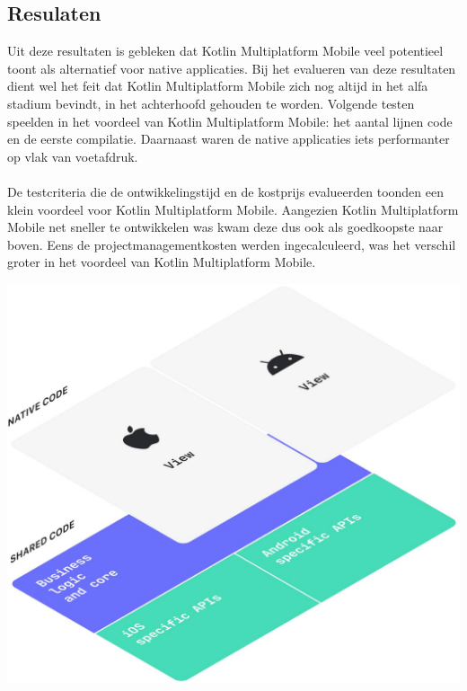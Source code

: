 \documentclass[a0,portrait]{a0poster}
\begin{document}
\begin{multicols}{2}
\section*{Resulaten}
\color{black}
Uit deze resultaten is gebleken dat Kotlin Multiplatform Mobile veel potentieel toont als alternatief voor native applicaties. Bij het evalueren van deze resultaten dient wel het feit dat Kotlin Multiplatform Mobile zich nog altijd in het alfa stadium bevindt, in het achterhoofd gehouden te worden. Volgende testen speelden in het voordeel van Kotlin Multiplatform Mobile: het aantal lijnen code en de eerste compilatie. Daarnaast waren de native applicaties iets performanter op vlak van voetafdruk.
\\ \\
De testcriteria die de ontwikkelingstijd en de kostprijs evalueerden toonden een klein voordeel voor Kotlin Multiplatform Mobile. Aangezien Kotlin Multiplatform Mobile net sneller te ontwikkelen was kwam deze dus ook als goedkoopste naar boven. Eens de projectmanagementkosten werden ingecalculeerd, was het verschil groter in het voordeel van Kotlin Multiplatform Mobile.

\begin{center}
    \includegraphics[width=1.0\linewidth]{kmm}
\end{center}





\end{multicols}
\end{document}
